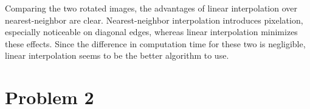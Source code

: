 \documentclass[aps,letterpaper,10pt]{article}
\begin{document}
Comparing the two rotated images, the advantages of linear interpolation over nearest-neighbor are clear.  Nearest-neighbor interpolation introduces pixelation, especially noticeable on diagonal edges, whereas linear interpolation minimizes these effects.  Since the difference in computation time for these two is negligible,  linear interpolation seems to be the better algorithm to use.


\newpage
\section{Problem 2}
\begin{figure}[!h]
\centering
{} \hspace{20px}
  \\
 \hspace{20px}

\end{figure}
\end{document}
